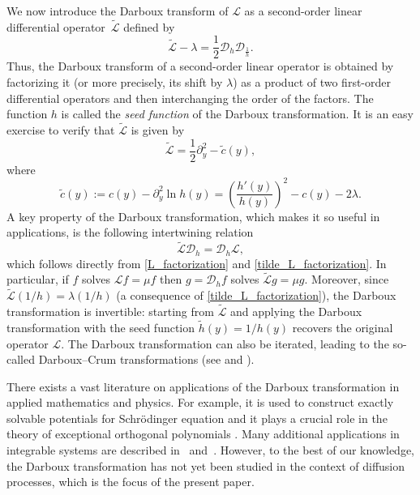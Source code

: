 \documentclass[10pt,a4paper]{amsart}
\numberwithin{equation}{section}
\theoremstyle{definition}
\def\L{{\mathcal L}}
\def\D{{\mathcal D}}
\begin{document}
We now introduce the Darboux transform of $\L$ as a second-order linear differential operator~$\widetilde \L$ defined by
 \begin{equation}\label{tilde_L_factorization}
 \widetilde \L-\lambda =\frac{1}{2}\D_h \D_{\frac{1}{h}}.
 \end{equation}
Thus, the Darboux transform of a second-order linear operator is obtained by factorizing it (or more precisely, its shift by $\lambda$) as a product of two first-order differential operators and then interchanging the order of the factors. The function $h$ is called the {\it seed function} of the Darboux transformation. It is an easy exercise to verify that $\widetilde \L$ is given by
\begin{equation}\label{def_tilde_L}
\widetilde \L = \frac{1}{2} \partial_y^2 - \tilde c(y),
\end{equation}
where
\[
\tilde c(y):=c(y) - \partial_y^2 \ln h(y)=\left(\frac{h'(y)}{h(y)}\right)^2-c(y)-2\lambda.
\]
A key property of the Darboux transformation, which makes it so useful in applications, is the following intertwining relation
\begin{equation}\label{L_tilde_L_intertwining}
 \widetilde \L \D_h = \D_h \L,
\end{equation}
which follows directly from \eqref{L_factorization} and \eqref{tilde_L_factorization}. In particular, if $f$ solves $\L f=\mu f$ then
$g=\D_h f$ solves $\widetilde \L g=\mu g$. Moreover, since $\widetilde \L (1/h)=\lambda (1/h)$ (a consequence of
\eqref{tilde_L_factorization}), the Darboux transformation is invertible: starting from $\widetilde \L$ and applying the Darboux transformation with the seed function $\tilde h(y)=1/h(y)$ recovers the original operator $\L$. The Darboux transformation can also be iterated, leading to the so-called Darboux--Crum transformations (see \cite{Crum_1955} and \cite[Section 2.4]{Gomez_2020}).

There exists a vast literature on applications of the Darboux transformation in applied mathematics and physics. For example, it is used to construct exactly solvable potentials for Schr\"odinger equation \cite{Bagrov_1997} and it plays a crucial role in the theory of exceptional orthogonal polynomials \cite{Garcia_2019, Ullate_2014}. Many additional applications in integrable systems are described in~\cite{Gu_2005}
and~\cite{Matveev_1991}. However, to the best of our knowledge, the Darboux transformation has not yet been studied in the context of diffusion processes, which is the focus of the present paper.
\end{document}
